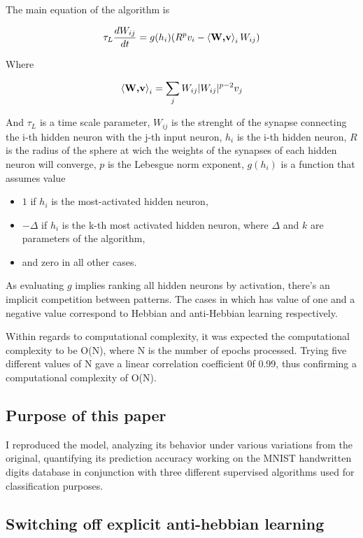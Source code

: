 \documentclass[a4paper]{report}
\begin{document}
The main equation of the algorithm is

\begin{equation}
    \tau_L \frac{dW_{ij}}{dt} = g(h_i)(R^p v_i - \braket{\textbf{W,v}}_i W_{ij} )
    \label{main}
\end{equation}

Where

\begin{equation}
    \braket{\textbf{W,v}}_i = \sum_j W_{ij} |W_{ij}|^{p-2} v_j
\end{equation}

And $\tau_L$ is a time scale parameter,  $W_{ij}$ is the strenght of the synapse connecting the i-th hidden neuron with the j-th input neuron, $h_i$ is the i-th hidden neuron, $R$ is the radius of the sphere at wich the weights of the synapses of each hidden neuron will converge, $p$ is the Lebesgue norm exponent, $g(h_i)$ is a function that assumes value
\begin{itemize}
    \item $1$ if $h_i$ is the most-activated hidden neuron,
    \item $-\Delta$ if $h_i$ is the k-th most activated hidden neuron, where $\Delta$ and $k$ are parameters of the algorithm,
    \item and zero in all other cases.
\end{itemize}

As evaluating $g$ implies ranking all hidden neurons by activation, there's an implicit competition between patterns. The cases in which has value of one and a negative value correspond to Hebbian and anti-Hebbian learning respectively.

Within regards to computational complexity, it was expected the computational complexity to be O(N), where N is the number of epochs processed. Trying five different values of N gave a linear correlation coefficient 0f 0.99, thus confirming a computational complexity of O(N).

\subsection{Purpose of this paper}

I reproduced the model, analyzing its behavior under various variations from the original, quantifying its prediction accuracy working on the MNIST handwritten digits database in conjunction with three different supervised algorithms used for classification purposes.

\subsection{Switching off explicit anti-hebbian learning}
\end{document}
